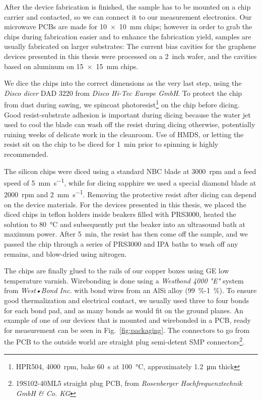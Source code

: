 % 
After the device fabrication is finished, the sample has to be mounted on a chip carrier and contacted, so we can connect it to our measurement electronics.
% 
Our microwave PCBs are made for \SI{10x10}{\milli\meter} chips; however in order to grab the chips during fabrication easier and to enhance the fabrication yield, samples are usually fabricated on larger substrates:
% 
The current bias cavities for the graphene devices presented in this thesis were processed on a \SI{2}{inch} wafer, and the cavities based on aluminum on \SI{15x15}{\milli\meter} chips.

We dice the chips into the correct dimensions as the very last step, using the \textit{Disco dicer} DAD 3220 from \textit{Disco Hi-Tec Europe GmbH}.
% 
To protect the chip from dust during sawing, we spincoat photoresist\footnote{HPR504, \SI{4000}{rpm}, bake \SI{60}{\second} at \SI{100}{\celsius}, approximately \SI{1.2}{\micro\meter} thick} on the chip before dicing.
% 
Good resist-substrate adhesion is important during dicing because the water jet used to cool the blade can wash off the resist during dicing otherwise, potentially ruining weeks of delicate work in the cleanroom.
% 
Use of HMDS, or letting the resist sit on the chip to be diced for \SI{1}{\minute} prior to spinning is highly recommended.

The silicon chips were diced using a standard NBC blade at \SI{3000}{rpm} and a feed speed of \SI{5}{\milli\meter\per\second}, while for dicing sapphire we used a special diamond blade at \SI{2000}{rpm} and \SI{2}{\milli\meter\per\second}.
% 
Removing the protective resist after dicing can depend on the device materials.
% 
For the devices presented in this thesis, we placed the diced chips in teflon holders inside beakers filled with PRS3000, heated the solution to \SI{80}{\celsius} and subsequently put the beaker into an ultrasound bath at maximum power.
% 
After \SI{5}{\minute}, the resist has then come off the sample, and we passed the chip through a series of PRS3000 and IPA baths to wash off any remains, and blow-dried using nitrogen.

% 
The chips are finally glued to the rails of our copper boxes using GE low temperature varnish.
% 
Wirebonding is done using a \textit{Westbond 4000 "E"} system from \textit{West•Bond Inc.} with bond wires from an AlSi alloy (\SI{99}{\percent}-\SI{1}{\percent}).
% 
To ensure good thermalization and electrical contact, we usually used three to four bonds for each bond pad, and as many bonds as would fit on the ground planes.
% 
An example of one of our devices that is mounted and wirebonded in a PCB, ready for measurement can be seen in Fig.~\ref{fig:packaging}.
% 
The connectors to go from the PCB to the outside world are straight plug semi-detent SMP connectors\footnote{19S102-40ML5 straight plug PCB, from \textit{Rosenberger Hochfrequenztechnik GmbH \& Co. KG}}.


